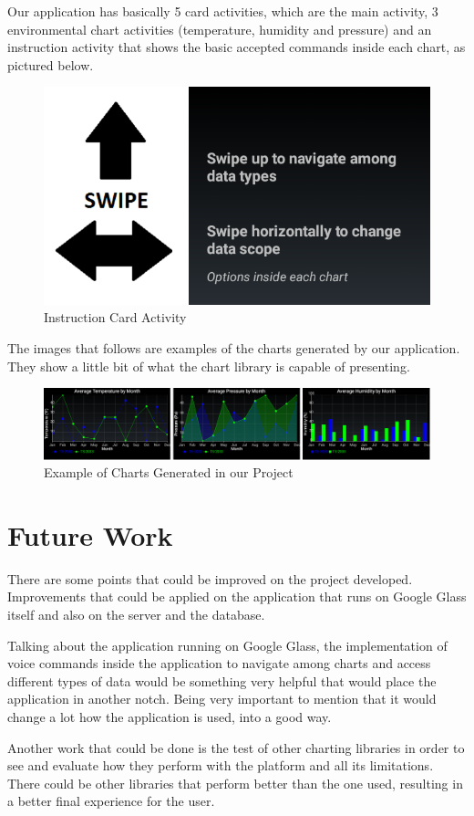 \documentclass[a4paper,11pt]{article}
\begin{document}
Our application has basically 5 card activities, which are the main activity, 3 environmental chart activities (temperature, humidity and pressure) and an instruction activity that shows the basic accepted commands inside each chart, as pictured below.

\begin{figure}[H]
\centering
\includegraphics[width = 0.4\linewidth]{images/information_card.png}
\caption{Instruction Card Activity}
\label{instructioncard}
\end{figure}

The images that follows are examples of the charts generated by our application. They show a little bit of what the chart library is capable of presenting.

\begin{figure}[H]
\centering
\includegraphics[width = 0.9\linewidth]{images/chart_example.png}
\caption{Example of Charts Generated in our Project}
\label{chartsexample}
\end{figure}

\section{Future Work}

There are some points that could be improved on the project developed. Improvements that could be applied on the application that runs on Google Glass itself \cite{googleglassproject} and also on the server and the database.

Talking about the application running on Google Glass, the implementation of voice commands inside the application to navigate among charts and access different types of data would be something very helpful that would place the application in another notch. Being very important to mention that it would change a lot how the application is used, into a good way.

Another work that could be done is the test of other charting libraries in order to see and evaluate how they perform with the platform and all its limitations. There could be other libraries that perform better than the one used, resulting in a better final experience for the user.
\end{document}
